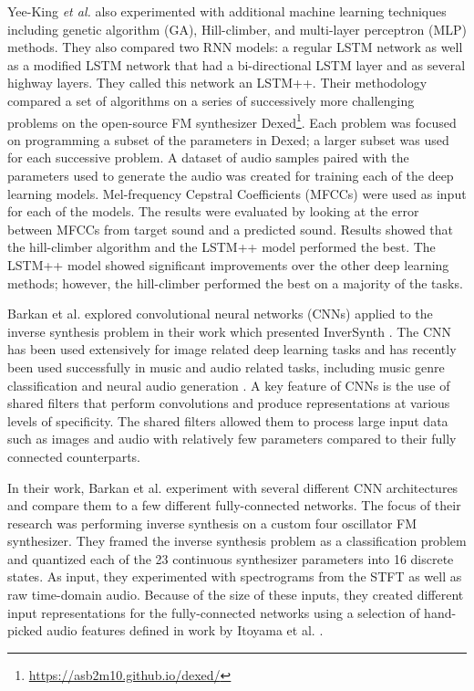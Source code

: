 Yee-King \textit{et al.} also experimented with additional machine learning techniques including genetic algorithm (GA), Hill-climber, and  multi-layer perceptron (MLP) methods. They also compared two RNN models: a regular LSTM network as well as a modified LSTM network that had a bi-directional LSTM layer and as several highway layers. They called this network an LSTM++. Their methodology compared a set of algorithms on a series of successively more challenging problems on the open-source FM synthesizer Dexed\footnote{\url{https://asb2m10.github.io/dexed/}}. Each problem was focused on programming a subset of the parameters in Dexed; a larger subset was used for each successive problem. A dataset of audio samples paired with the parameters used to generate the audio was created for training each of the deep learning models. Mel-frequency Cepstral Coefficients (MFCCs) were used as input for each of the models. The results were evaluated by looking at the error between MFCCs from target sound and a predicted sound. Results showed that the hill-climber algorithm and the LSTM++ model performed the best. The LSTM++ model showed significant improvements over the other deep learning methods; however, the hill-climber performed the best on a majority of the tasks.

Barkan et al. explored convolutional neural networks (CNNs) applied to the inverse synthesis problem in their work which presented InverSynth \cite{barkan2019deep}. The CNN has been used extensively for image related deep learning tasks and has recently been used successfully in music and audio related tasks, including music genre classification \cite{choi2016automatic} and neural audio generation \cite{donahue2018adversarial}. A key feature of CNNs is the use of shared filters that perform convolutions and produce representations at various levels of specificity. The shared filters allowed them to process large input data such as images and audio with relatively few parameters compared to their fully connected counterparts. 

In their work, Barkan et al. experiment with several different CNN architectures and compare them to a few different fully-connected networks. The focus of their research was performing inverse synthesis on a custom four oscillator FM synthesizer. They framed the inverse synthesis problem as a classification problem and quantized each of the 23 continuous synthesizer parameters into 16 discrete states. As input, they experimented with spectrograms from the STFT as well as raw time-domain audio. Because of the size of these inputs, they created different input representations for the fully-connected networks using a selection of hand-picked audio features defined in work by Itoyama et al. \cite{itoyama2014parameter}.


